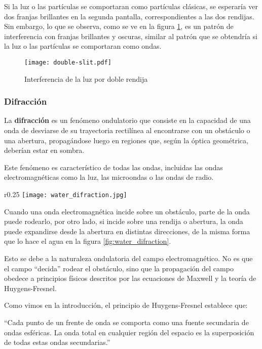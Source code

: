 Si la luz o las partículas se comportaran como partículas clásicas, se esperaría ver dos franjas brillantes en la segunda pantalla, correspondientes a las dos rendijas. Sin embargo, lo que se observa, como se ve en la figura \ref{fig:double_slit}, es un patrón de interferencia con franjas brillantes y oscuras, similar al patrón que se obtendría si la luz o las partículas se comportaran como ondas.


\begin{figure}[ht]
  \centering
  \texttt{[image: double-slit.pdf]}
  \caption{Interferencia de la luz por doble rendija}
  \label{fig:double_slit}
\end{figure}

\subsubsection{Difracción}

La \textbf{difracción} es un fenómeno ondulatorio que consiste en la capacidad de una onda de desviarse de su trayectoria rectilínea al encontrarse con un obstáculo o una abertura, propagándose luego en regiones que, según la óptica geométrica, deberían estar en sombra.

Este fenómeno es característico de todas las ondas, incluidas las ondas electromagnéticas como la luz, las microondas o las ondas de radio.

\begin{wrapfigure}{r}{0.25\textwidth}
  \centering
  \texttt{[image: water\_difraction.jpg]}
  \caption{Fenómeno de difracción en agua}
  \label{fig:water_difraction}
\end{wrapfigure}
Cuando una onda electromagnética incide sobre un obstáculo, parte de la onda puede rodearlo, por otro lado, si incide sobre una rendija o abertura, la onda puede expandirse desde la abertura en distintas direcciones, de la misma forma que lo hace el agua en la figura \ref{fig:water_difraction}.

Esto se debe a la naturaleza ondulatoria del campo electromagnético. No es que el campo ``decida'' rodear el obstáculo, sino que la propagación del campo obedece a principios físicos descritos por las ecuaciones de Maxwell y la teoría de Huygens-Fresnel.

Como vimos en la introducción, el principio de Huygens-Fresnel establece que:

``Cada punto de un frente de onda se comporta como una fuente secundaria de ondas esféricas. La onda total en cualquier región del espacio es la superposición de todas estas ondas secundarias.''

